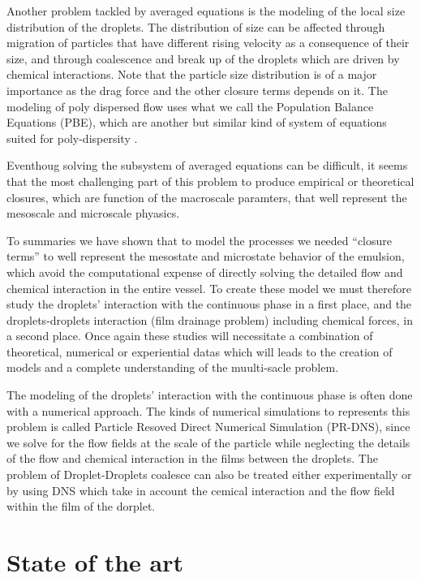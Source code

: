 Another problem tackled by averaged equations is the modeling of the local size distribution of the droplets. 
The distribution of size can be affected through migration of particles that have different rising velocity as a consequence of their size, and through coalescence and break up of the droplets which are driven by chemical interactions. 
Note that the particle size distribution is of a major importance as the drag force and the other closure terms depends on it. 
The modeling of poly dispersed flow uses what we call the Population Balance Equations (PBE), which are another but similar kind of system of equations suited for poly-dispersity \citet{marchisio2005solution}. 


Eventhoug solving the subsystem of averaged equations can be difficult, it seems that the most challenging part of this problem to produce empirical or theoretical closures,  which are function of the macroscale paramters, that well represent the mesoscale and microscale phyasics.


To summaries we have shown that to model the processes we needed ``closure terms'' to well represent the mesostate and microstate behavior of the emulsion, which avoid the computational expense of directly solving the detailed flow and chemical interaction in the entire vessel. 
To create these model we must therefore study the droplets' interaction with the continuous phase in a first place, and the droplets-droplets interaction (film drainage problem) including chemical forces, in a second place.
Once again these studies will necessitate a combination of theoretical, numerical or experiential datas which will leads to the creation of models and a complete understanding of the muulti-sacle problem.

The modeling of the droplets' interaction with the continuous phase is often done with a numerical approach. 
The kinds of numerical simulations to represents this problem is called Particle Resoved Direct Numerical Simulation (PR-DNS), since we solve for the flow fields at the scale of the particle while neglecting the details of the flow and chemical interaction in the films between the droplets. 
The problem of Droplet-Droplets coalesce can also be treated either experimentally or by using DNS which take in account the cemical interaction and the flow field within the film of the dorplet. 





\section{State of the art}

